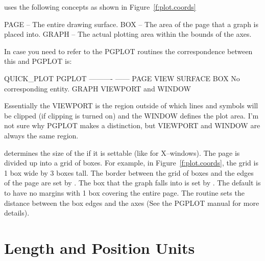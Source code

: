 \quickplot uses the following concepts as shown in Figure~\ref{f:plot.coords}
\begin{example}
  PAGE  -- The entire drawing surface.
  BOX   -- The area of the page that a graph is placed into.
  GRAPH -- The actual plotting area within the bounds of the axes.
\end{example}
In case you need to refer to the PGPLOT routines the correspondence
between this and PGPLOT is:
\begin{example}
  QUICK_PLOT    PGPLOT
  ----------    ------
  PAGE          VIEW SURFACE
  BOX           No corresponding entity.
  GRAPH         VIEWPORT and WINDOW
\end{example}
Essentially the VIEWPORT is the region outside of which lines and symbols
will be clipped (if clipping is turned on) and the WINDOW defines the
plot area. I'm not sure why PGPLOT makes a distinction, but VIEWPORT and
WINDOW are always the same region.

 determines the size of the  if it is
settable (like for X--windows). The page is divided up into a grid of
boxes. For example, in Figure~\ref{f:plot.coords}, the grid is 1 box
wide by 3 boxes tall. The border between the grid of boxes and the
edges of the page are set by .  The box that
the graph falls into is set by . The default is to
have no margins with 1 box covering the entire page. The
 routine sets the distance between the box edges
and the axes (See the PGPLOT manual for more details).


\section{Length and Position Units}
\label{s:plot.units}

